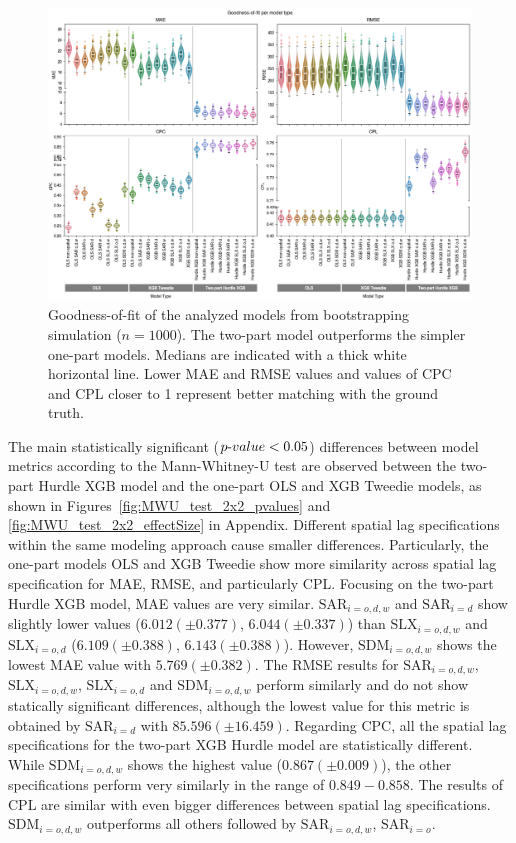 

\begin{figure}[ht!]
    \centering
    \includegraphics[width=1\textwidth]{fig_all_models_goodness_of_fit_2x2_n1000.png}
    \caption{Goodness-of-fit of the analyzed models from bootstrapping simulation ($n=1000$). The two-part model outperforms the simpler one-part models. Medians are indicated with a thick white horizontal line. Lower MAE and RMSE values and values of CPC and CPL closer to 1 represent better matching with the ground truth.}
    \label{fig:boxplots_results}
\end{figure}

The main statistically significant ($p{\text -}value<0.05$) differences between model metrics according to the Mann-Whitney-U test \citep{Mann1947} are observed between the two-part Hurdle XGB model and the one-part OLS and XGB Tweedie models, as shown in Figures~\ref{fig:MWU_test_2x2_pvalues} and \ref{fig:MWU_test_2x2_effectSize} in Appendix.
Different spatial lag specifications within the same modeling approach cause smaller differences. 
Particularly, the one-part models OLS and XGB Tweedie show more similarity across spatial lag specification for MAE, RMSE, and particularly CPL.
Focusing on the two-part Hurdle XGB model, MAE values are very similar. $\text{SAR}_{i=o,d,w}$ and $\text{SAR}_{i=d}$ show slightly lower values ($6.012(\pm0.377)$, $6.044(\pm0.337)$) than $\text{SLX}_{i=o,d,w}$ and $\text{SLX}_{i=o,d}$ ($6.109(\pm0.388)$, $6.143(\pm0.388)$). However, $\text{SDM}_{i=o,d,w}$ shows the lowest MAE value with $5.769(\pm0.382)$.
The RMSE results for $\text{SAR}_{i=o,d,w}$, $\text{SLX}_{i=o,d,w}$, $\text{SLX}_{i=o,d}$ and $\text{SDM}_{i=o,d,w}$ perform similarly and do not show statically significant differences, although the lowest value for this metric is obtained by $\text{SAR}_{i=d}$ with $85.596(\pm16.459)$. Regarding CPC, all the spatial lag specifications for the two-part XGB Hurdle model are statistically different. While $\text{SDM}_{i=o,d,w}$ shows the highest value ($0.867(\pm0.009)$), the other specifications perform very similarly in the range of $0.849-0.858$. The results of CPL are similar with even bigger differences between spatial lag specifications. $\text{SDM}_{i=o,d,w}$ outperforms all others followed by $\text{SAR}_{i=o,d,w}$, $\text{SAR}_{i=o}$.

